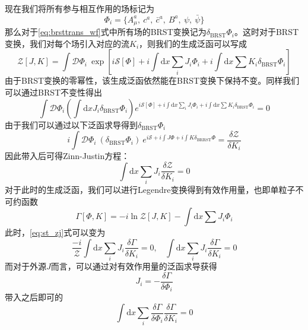 现在我们将所有参与相互作用的场标记为
\begin{equation}
    \Phi_i = \{A_\mu^a,~c^a,~ \bar{c}^a,~B^a,~\psi,~\bar{\psi}\}
\end{equation}
那么对于\eqref{eq:brsttrans_wf}式中所有场的BRST变换记为$\delta_\text{BRST}\Phi_i$。这时对于BRST变换，我们对每个场引入对应的流$K_i$，则我们的生成泛函可以写成
\begin{equation}
    \mathcal{Z}[J,K] = \int\mathcal{D}\Phi_i~\exp\left[ i\mathcal{S}[\Phi] + i\int\mathrm{d}x\sum_i J_i\Phi_i + i\int\mathrm{d}x \sum K_i \delta_\text{BRST}\Phi_i\right]
\end{equation}
由于BRST变换的零幂性，该生成泛函依然能在BRST变换下保持不变。同样我们可以通过BRST不变性得出
\begin{equation}
\int\mathcal{D}\Phi_i\left(\int\mathrm{d}xJ_i\delta_\text{BRST}\Phi_i \right)e^{ i\mathcal{S}[\Phi] + i\int\mathrm{d}x\sum_i J_i\Phi_i + i\int\mathrm{d}x \sum K_i \delta_\text{BRST}\Phi_i} = 0
\end{equation}
由于我们可以通过以下泛函求导得到$\delta_\text{BRST}\Phi_i$
\begin{equation}
   i\int\mathcal{D}\Phi_i~ (\delta_\text{BRST}\Phi_i) ~e^{i\mathcal{S}+i\int J\Phi + i\int K \delta_\text{BRRST}\Phi}= \frac{\delta\mathcal{Z}}{\delta K_i}
\end{equation}
因此带入后可得Zinn-Justin方程：
\begin{equation}
    \int\mathrm{d}x\sum_i J_i\frac{\delta \mathcal{Z}}{\delta K_i} = 0\label{eq:st_zj}
\end{equation}
对于此时的生成泛函，我们可以进行Legendre变换得到有效作用量，也即单粒子不可约函数
\begin{equation}
    \Gamma[\Phi,K] = -i\ln\mathcal{Z}[J,K]-\int\mathrm{d}x\sum J_i\Phi_i
\end{equation}
此时，\eqref{eq:st_zj}式可以变为
\begin{equation}
    \frac{-i}{\mathcal{Z}}\int\mathrm{d}x\sum_i J_i\frac{\delta\Gamma}{\delta K_i} =0,~~~~\int\mathrm{d}x\sum_i J_i\frac{\delta \Gamma}{\delta K_i} =  0
\end{equation}
而对于外源$J$而言，可以通过对有效作用量的泛函求导获得
\begin{equation}
    J_i =-\frac{\delta\Gamma}{\delta\Phi_i}
\end{equation}
带入之后即可的
\begin{equation}
    \int\mathrm{d}x\sum_i \frac{\delta\Gamma}{\delta\Phi_i}\frac{\delta \Gamma}{\delta K_i} =  0
\end{equation}
